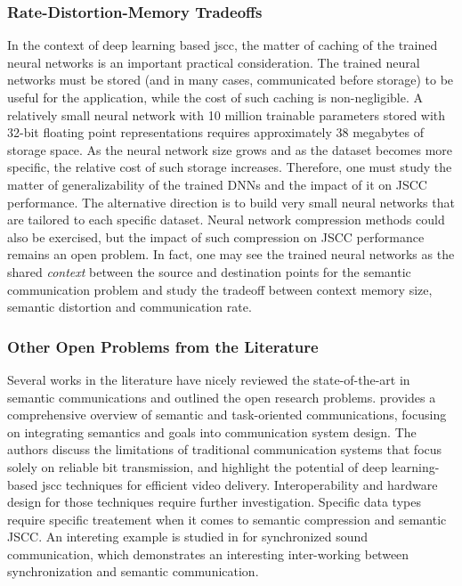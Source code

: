 \subsubsection{Rate-Distortion-Memory Tradeoffs} 
In the context of deep learning based \gls{jscc}, the matter of caching of the trained neural networks is an important practical consideration. The trained neural networks must be stored (and in many cases, communicated before storage) to be useful for the application, while the cost of such caching is non-negligible. A relatively small neural network with 10 million trainable parameters stored with 32-bit floating point representations requires approximately 38 megabytes of storage space. As the neural network size grows and as the dataset becomes more specific, the relative cost of such storage increases. Therefore, one must study the matter of generalizability of the trained DNNs and the impact of  it on  JSCC performance. The alternative direction is to build very small neural networks that are tailored to  each specific dataset. Neural network compression methods \cite{neill2020overview} could also be exercised, but the impact of such  compression on JSCC performance remains an open problem. In fact, one may see the trained neural networks as the shared \emph{context} between the source and destination points for the semantic communication problem and study the tradeoff between context memory size, semantic distortion and communication rate. 


\subsubsection{Other Open Problems from the Literature}
Several works in the literature have nicely reviewed the state-of-the-art in semantic communications and outlined the open research problems.  \cite{gunduz2022beyond} provides a comprehensive overview of semantic and task-oriented communications, focusing on integrating semantics and goals into communication system design. The authors discuss the limitations of traditional communication systems that focus solely on reliable bit transmission, and highlight the potential of deep learning-based \gls{jscc} techniques for efficient video delivery. Interoperability and hardware design for those techniques require further investigation. 
Specific data types require specific treatement when it comes to semantic compression and semantic JSCC. An intereting example is studied in  \cite{liang2024semantic} for synchronized sound communication, which demonstrates an interesting inter-working between synchronization and semantic communication. 

